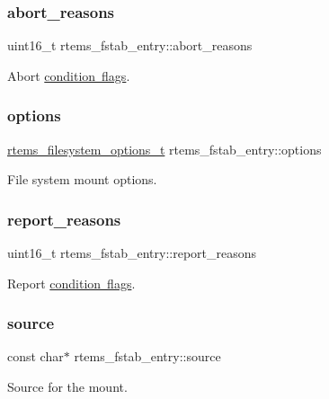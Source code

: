 \subsubsection{\texorpdfstring{abort\_reasons}{abort\_reasons}}
{\footnotesize\ttfamily uint16\+\_\+t rtems\+\_\+fstab\+\_\+entry\+::abort\+\_\+reasons}

Abort \mbox{\hyperlink{group__rtems__fstab_gabcbeff39e673bbef9ec0960f64d19228}{condition flags}}. \mbox{\label{structrtems__fstab__entry_a2f2f6d2e80d9b535e668ae56ef8c386f}} 
\subsubsection{\texorpdfstring{options}{options}}
{\footnotesize\ttfamily \mbox{\hyperlink{group__FileSystemTypesAndMount_gabb3a23ee6b6e7aacb719a1a81716af7a}{rtems\+\_\+filesystem\+\_\+options\+\_\+t}} rtems\+\_\+fstab\+\_\+entry\+::options}

File system mount options. \mbox{\label{structrtems__fstab__entry_ab3b5d5d525b7f5a3981b54a87e9172dd}} 
\subsubsection{\texorpdfstring{report\_reasons}{report\_reasons}}
{\footnotesize\ttfamily uint16\+\_\+t rtems\+\_\+fstab\+\_\+entry\+::report\+\_\+reasons}

Report \mbox{\hyperlink{group__rtems__fstab_gabcbeff39e673bbef9ec0960f64d19228}{condition flags}}. \mbox{\label{structrtems__fstab__entry_a399f942386cf428636ba749fc076dc8d}} 
\subsubsection{\texorpdfstring{source}{source}}
{\footnotesize\ttfamily const char$\ast$ rtems\+\_\+fstab\+\_\+entry\+::source}

Source for the mount. \mbox{\label{structrtems__fstab__entry_a835ee3be89c0b487652f42b0b2fe37f5}} 
